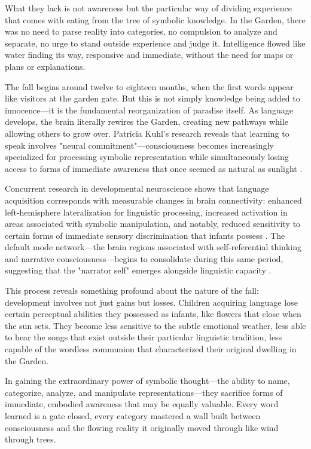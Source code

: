 What they lack is not awareness but the particular way of dividing experience that comes with eating from the tree of symbolic knowledge. In the Garden, there was no need to parse reality into categories, no compulsion to analyze and separate, no urge to stand outside experience and judge it. Intelligence flowed like water finding its way, responsive and immediate, without the need for maps or plans or explanations.

The fall begins around twelve to eighteen months, when the first words appear like visitors at the garden gate. But this is not simply knowledge being added to innocence—it is the fundamental reorganization of paradise itself. As language develops, the brain literally rewires the Garden, creating new pathways while allowing others to grow over. Patricia Kuhl's research reveals that learning to speak involves "neural commitment"—consciousness becomes increasingly specialized for processing symbolic representation while simultaneously losing access to forms of immediate awareness that once seemed as natural as sunlight \parencite{kuhl2004early,kuhl2010brain}. 

Concurrent research in developmental neuroscience shows that language acquisition corresponds with measurable changes in brain connectivity: enhanced left-hemisphere lateralization for linguistic processing, increased activation in areas associated with symbolic manipulation, and notably, reduced sensitivity to certain forms of immediate sensory discrimination that infants possess \parencite{werker1984cross,sebastiangalles2012early}. The default mode network—the brain regions associated with self-referential thinking and narrative consciousness—begins to consolidate during this same period, suggesting that the "narrator self" emerges alongside linguistic capacity \parencite{fair2008development}.

This process reveals something profound about the nature of the fall: development involves not just gains but losses. Children acquiring language lose certain perceptual abilities they possessed as infants, like flowers that close when the sun sets. They become less sensitive to the subtle emotional weather, less able to hear the songs that exist outside their particular linguistic tradition, less capable of the wordless communion that characterized their original dwelling in the Garden.

In gaining the extraordinary power of symbolic thought—the ability to name, categorize, analyze, and manipulate representations—they sacrifice forms of immediate, embodied awareness that may be equally valuable. Every word learned is a gate closed, every category mastered a wall built between consciousness and the flowing reality it originally moved through like wind through trees.

